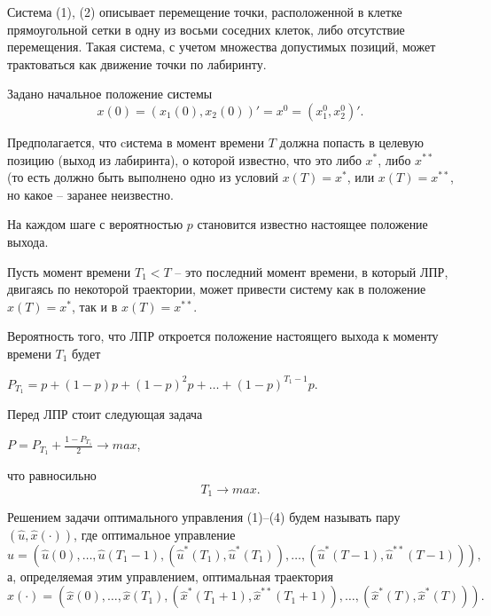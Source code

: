 Система (1), (2) описывает перемещение точки, расположенной в клетке прямоугольной сетки в одну из восьми соседних клеток, либо отсутствие перемещения. %
Такая система, с учетом множества допустимых позиций, может трактоваться как движение точки по лабиринту.

Задано начальное положение системы
\begin{equation} \label{eq3}
 x(0)=(x_1(0),x_2(0))'=x^0=(x_1^0,x_2^0)'.
\end{equation}

Предполагается, что cистема в момент времени $T$ должна попасть в целевую позицию (выход из лабиринта), о которой известно, что это либо $x^*$, либо $x^{**}$ (то есть должно быть выполнено одно из условий $x(T)=x^*$, или $x(T)=x^{**}$, но какое -- заранее неизвестно.

На каждом шаге с вероятностью $p$ становится известно настоящее положение выхода.

Пусть момент времени $T_1<T$ -- это последний момент времени, в который ЛПР, двигаясь по некоторой траектории, может привести систему как в положение $x(T)=x^*$, так и в $x(T)=x^{**}$.

Вероятность того, что ЛПР откроется положение настоящего выхода к моменту времени $T_1$ будет 
\begin{center}
$P_{T_1}=p+(1-p)p+{(1-p)^2}p+\ldots+{(1-p)^{{T_1}-1}p}$.
\end{center}
Перед ЛПР стоит следующая задача
\begin{center}
$P=P_{T_1}+\frac{1-P_{T_1}}{2}\rightarrow max$,
\end{center}
что равносильно 
\begin{equation} \label{eq4}
T_1 \rightarrow max .
\end{equation}


Решением задачи оптимального управления (1)--(4) будем называть пару $(\hat{u}, \hat{x}(\cdot))$, где
оптимальное управление
$$
\hat{u}=(\hat{u}(0),\ldots ,\hat{u}({{T}_{1}}-1),({{{\hat{u}}}^{*}}({{T}_{1}}),{{{\hat{u}}}^{*}}({{T}_{1}})),\ldots ,({{{\hat{u}}}^{*}}(T-1),{{{\hat{u}}}^{**}}(T-1))),
$$
а, определяемая этим управлением, оптимальная траектория
$$
\hat{x}(\cdot)=(\hat{x}(0),\ldots ,\hat{x}({{T}_{1}}),({{{\hat{x}}}^{*}}({{T}_{1}}+1),{{{\hat{x}}}^{**}}({{T}_{1}}+1)),\ldots ,({{{\hat{x}}}^{*}}(T),{{{\hat{x}}}^{*}}(T))).
$$

